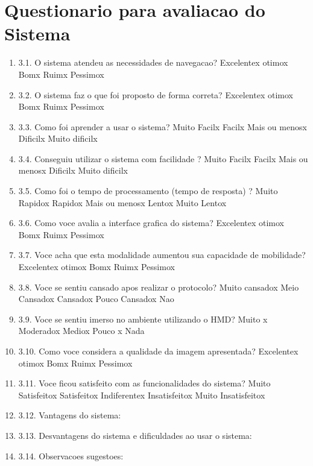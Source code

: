 \section{Questionario para avaliacao do Sistema}
\begin{enumerate}
\item 3.1.	O sistema atendeu as necessidades de navegacao? Excelentex otimox Bomx Ruimx Pessimox
\item 3.2.	O sistema faz o que foi proposto de forma correta? Excelentex otimox Bomx Ruimx Pessimox
\item 3.3.	Como foi aprender a usar o sistema? Muito Facilx Facilx Mais ou menosx Dificilx Muito dificilx
\item 3.4.	Conseguiu utilizar o sistema com facilidade ? Muito Facilx Facilx Mais ou menosx Dificilx Muito dificilx
\item 3.5.	Como foi o tempo de processamento (tempo de resposta) ? Muito Rapidox Rapidox Mais ou menosx Lentox Muito Lentox
\item 3.6.	Como voce avalia a interface grafica do sistema? Excelentex otimox Bomx Ruimx Pessimox
\item 3.7.	Voce acha que esta modalidade aumentou sua capacidade de mobilidade? Excelentex otimox Bomx Ruimx Pessimox
\item 3.8.	Voce se sentiu cansado apos realizar o protocolo? Muito cansadox  Meio Cansadox  Cansadox  Pouco Cansadox  Nao
\item 3.9.	Voce se sentiu imerso no ambiente utilizando o HMD? Muito x  Moderadox  Mediox  Pouco x  Nada
\item 3.10.	Como voce considera a qualidade da imagem apresentada? Excelentex otimox Bomx Ruimx Pessimox
\item 3.11.	Voce ficou satisfeito com as funcionalidades do sistema? Muito Satisfeitox  Satisfeitox  Indiferentex  Insatisfeitox  Muito Insatisfeitox
\item 3.12.	Vantagens do sistema:
\item 3.13.	 Desvantagens do sistema e dificuldades ao usar o sistema:
\item 3.14.	 Observacoes sugestoes:
\end{enumerate}



